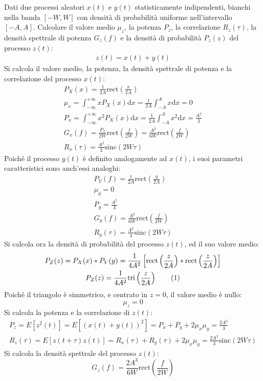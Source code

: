 \documentclass{article}
\newcommand{\intinf}{\displaystyle\int_{-\infty}^{+\infty}}
\newcommand{\rect}{\mathrm{rect}}
\newcommand{\sinc}{\mathrm{sinc}}
\newcommand{\tri}{\mathrm{tri}}
\newcommand{\df}{\mathrm{d}}
\newcommand{\tageq}{\tag{\stepcounter{equation}\theequation}}
\begin{document}
Dati due processi aleatori $x(t)$ e $y(t)$ statisticamente indipendenti, bianchi nella banda $[-W,W]$ con densità di probabilità uniforme nell'intervallo $[-A,A]$. Calcolare il 
valore medio $\mu_z$, la potenza $P_z$, la correlazione $R_z(\tau)$, la densità spettrale di potenza $G_z(f)$ e la densità di probabilità $P_z(z)$ del 
processo $z(t)$:
\begin{gather*}
    z(t)=x(t)+y(t)
\end{gather*}
Si calcola il valore medio, la potenza, la densità spettrale di potenza e la correlazione del processo $x(t)$:
\begin{gather*}
    P_X(x)=\displaystyle\frac{1}{2A}\rect\left(\frac{x}{2A}\right)\\
    \mu_x=\intinf xP_X(x)\df x=\frac{1}{2A}\int_{-A}^Ax\df x=0\\
    P_x=\intinf x^2P_X(x)\df x=\frac{1}{2A}\int_{-A}^Ax^2\df x=\frac{A^2}{3}\\
    G_x(f)=\displaystyle\frac{P_x}{2W}\rect\left(\frac{f}{2W}\right)=\frac{A^2}{6W}\rect\left(\frac{f}{2W}\right)\\
    R_x(\tau)=\displaystyle\frac{A^2}{3}\sinc(2W\tau)
\end{gather*}
Poiché il processo $y(t)$ è definito analogamente ad $x(t)$, i suoi parametri caratteristici sono anch'essi analoghi:
\begin{gather*}
    P_Y(f)=\displaystyle\frac{1}{2A}\rect\left(\frac{y}{2A}\right)\\
    \mu_y=0\\
    P_y=\displaystyle\frac{A^2}{3}\\
    G_y(f)=\displaystyle\frac{A^2}{6W}\rect\left(\frac{f}{2W}\right)\\
    R_y(\tau)=\displaystyle\frac{A^2}{3}\sinc(2W\tau)
\end{gather*}
Si calcola ora la densità di probabilità del processo $z(t)$, ed il suo valore medio: 
\begin{gather*}
    P_Z(z)=P_X(x)*P_Y(y)=\frac{1}{4A^2}\left[\rect\left(\frac{z}{2A}\right)*\rect\left(\frac{z}{2A}\right)\right]\\
    P_Z(z)=\displaystyle\frac{1}{4A^2}\tri\left(\frac{z}{2A}\right)\tageq
\end{gather*}
Poiché il triangolo è simmetrico, e centrato in $z=0$, il valore medio è nullo:
\begin{equation}
    \mu_z=0
\end{equation}
Si calcola la potenza e la correlazione di $z(t)$:
\begin{gather}
    P_z=E[z^2(t)]=E[(x(t)+y(t))^2]=P_x+P_y+2\mu_x\mu_y=\displaystyle\frac{2A^2}{3}\\
    R_z(\tau)=E[z(t+\tau)z(t)]=R_x(\tau)+R_y(\tau)+2\mu_x\mu_y=\displaystyle\frac{2A^2}{3}\sinc(2W\tau)
\end{gather}
Si calcola la densità spettrale del processo $z(t)$:
\begin{equation}
    G_z(f)=\displaystyle\frac{2A^3}{6W}\rect\left(\frac{f}{2W}\right)
\end{equation}
\end{document}
